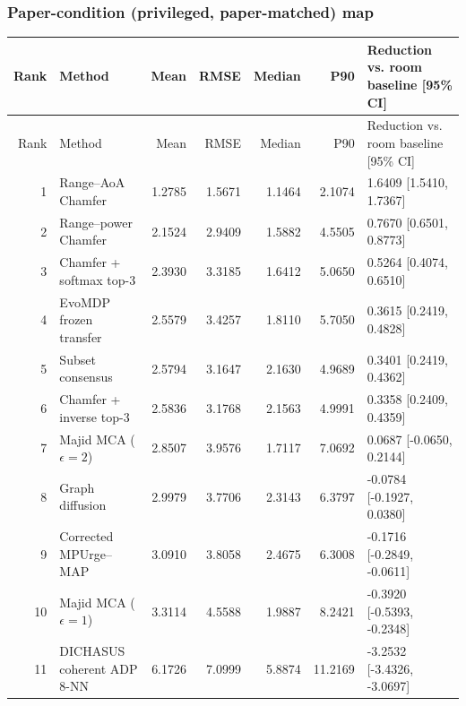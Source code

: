 \subsubsection{Paper-condition (privileged, paper-matched) map}
\begingroup\scriptsize\setlength{\tabcolsep}{3.2pt}
\begin{longtable}{@{}r p{.28\linewidth} r r r r p{.23\linewidth}@{}}
\toprule Rank & Method & Mean & RMSE & Median & P90 & Reduction vs. room baseline [95\% CI] \\
\midrule\endfirsthead
\toprule Rank & Method & Mean & RMSE & Median & P90 & Reduction vs. room baseline [95\% CI] \\
\midrule\endhead
1 & Range--AoA Chamfer & 1.2785 & 1.5671 & 1.1464 & 2.1074 & 1.6409 [1.5410, 1.7367] \\
2 & Range--power Chamfer & 2.1524 & 2.9409 & 1.5882 & 4.5505 & 0.7670 [0.6501, 0.8773] \\
3 & Chamfer + softmax top-3 & 2.3930 & 3.3185 & 1.6412 & 5.0650 & 0.5264 [0.4074, 0.6510] \\
4 & EvoMDP frozen transfer & 2.5579 & 3.4257 & 1.8110 & 5.7050 & 0.3615 [0.2419, 0.4828] \\
5 & Subset consensus & 2.5794 & 3.1647 & 2.1630 & 4.9689 & 0.3401 [0.2419, 0.4362] \\
6 & Chamfer + inverse top-3 & 2.5836 & 3.1768 & 2.1563 & 4.9991 & 0.3358 [0.2409, 0.4359] \\
7 & Majid MCA ($\epsilon=2$) & 2.8507 & 3.9576 & 1.7117 & 7.0692 & 0.0687 [-0.0650, 0.2144] \\
8 & Graph diffusion & 2.9979 & 3.7706 & 2.3143 & 6.3797 & -0.0784 [-0.1927, 0.0380] \\
9 & Corrected MPUrge--MAP & 3.0910 & 3.8058 & 2.4675 & 6.3008 & -0.1716 [-0.2849, -0.0611] \\
10 & Majid MCA ($\epsilon=1$) & 3.3114 & 4.5588 & 1.9887 & 8.2421 & -0.3920 [-0.5393, -0.2348] \\
11 & DICHASUS coherent ADP 8-NN & 6.1726 & 7.0999 & 5.8874 & 11.2169 & -3.2532 [-3.4326, -3.0697] \\
\bottomrule
\end{longtable}\endgroup
